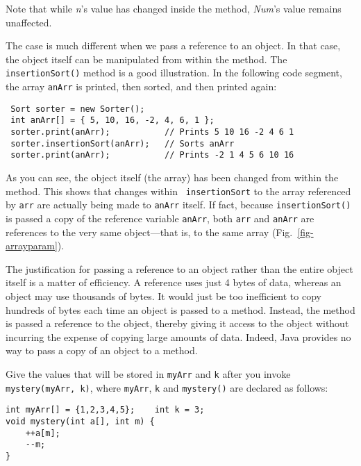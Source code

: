 \noindent Note that while {\it n}'s value has changed inside the
method, {\it Num}'s value remains unaffected.

The case is much different when we pass a reference to an object.  In
that case, the object itself can be manipulated from within the
method.  The {\tt insertionSort()} method is a good illustration.  In
the following code
segment, the array {\tt anArr} is printed, then sorted, and then printed
again:

\begin{jjjlisting}
\begin{lstlisting}
 Sort sorter = new Sorter();
 int anArr[] = { 5, 10, 16, -2, 4, 6, 1 }; 
 sorter.print(anArr);           // Prints 5 10 16 -2 4 6 1
 sorter.insertionSort(anArr);   // Sorts anArr
 sorter.print(anArr);           // Prints -2 1 4 5 6 10 16
\end{lstlisting}
\end{jjjlisting}

\noindent As you can see, the object itself (the array) has been
changed from within the method. This shows that changes within {\tt
insertionSort} to the array referenced by {\tt arr} are actually being
made to {\tt anArr} itself.  If fact, because {\tt insertionSort()} is
passed a copy of the reference variable {\tt anArr}, both {\tt arr}
and {\tt anArr} are references to the very same object---that is, to
the same array (Fig.~\ref{fig-arrayparam}).

\begin{figure}[tbh]
\end{figure}

The justification for passing a reference to an object rather than the
entire object itself is a matter of efficiency.  A reference uses just
4 bytes of data, whereas an object may use thousands of bytes.   It
would just be too inefficient to copy hundreds of bytes each time an
object is passed to a method.  Instead, the method is passed a
reference to the object, thereby giving it access to the object
without incurring the expense of copying large amounts of data.
Indeed, Java provides no way to pass a copy of an object to a method.

\begin{SSTUDY}

\item Give the values that will be stored in {\tt myArr} and {\tt k}
after you invoke {\tt mystery(myArr, k)}, where {\tt myArr}, {\tt k}
and {\tt mystery()} are declared as follows:

\begin{jjjlisting}
\begin{lstlisting}
int myArr[] = {1,2,3,4,5};    int k = 3;
void mystery(int a[], int m) {
    ++a[m];
    --m;
}
\end{lstlisting}
\end{jjjlisting}

\end{SSTUDY}

